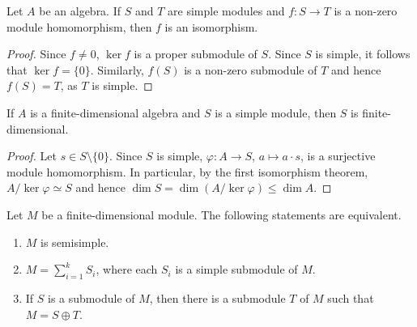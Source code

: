 
\begin{lemma}[Schur]
	Let $A$ be an algebra. If $S$ and $T$ are
	simple modules and $f\colon S\to T$ is a non-zero module homomorphism, 
	then $f$ is an isomorphism. 
\end{lemma}

\begin{proof}
Since $f\ne 0$, $\ker f$ is a proper submodule of $S$. Since $S$ is simple, it follows 
that $\ker f=\{0\}$. Similarly, $f(S)$ 
is a non-zero submodule of $T$ and hence $f(S)=T$, as $T$ is simple. 	
\end{proof}

\begin{proposition}
    If $A$ is a finite-dimensional algebra and $S$ is a simple module, then $S$ is finite-dimensional. 
\end{proposition}

\begin{proof}
    Let $s\in S\setminus\{0\}$. Since $S$ is simple, $\varphi\colon A\to S$, $a\mapsto a\cdot s$, is a surjective 
    module homomorphism. 
    In particular, by the first isomorphism theorem, $A/\ker\varphi\simeq S$ and hence $\dim S=\dim (A/\ker\varphi)\leq \dim A$. 
\end{proof}

\begin{proposition}
\label{pro:semisimple}
	Let $M$ be a finite-dimensional module. The following statements are equivalent.
	\begin{enumerate}
		\item $M$ is semisimple.
		\item $M=\sum_{i=1}^k S_i$, where each $S_i$ is a simple submodule of $M$. 
		\item If $S$ is a submodule of $M$, then there is a submodule $T$ of $M$ such that $M=S\oplus T$.    
	\end{enumerate}
\end{proposition}


